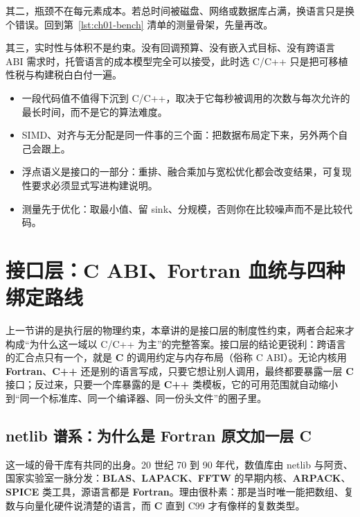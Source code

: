 \documentclass[12pt,a4paper,fontset=fandol]{ctexbook}
\newcommand{\Lib}[1]{\textbf{#1}}
\newcommand{\Lang}[1]{\textsf{\bfseries #1}}
\newcommand{\CL}{\Lang{C}}
\newcommand{\CPP}{\Lang{C++}}
\newcommand{\FTN}{\Lang{Fortran}}
\begin{document}
其二，瓶颈不在每元素成本。若总时间被磁盘、网络或数据库占满，换语言只是换个错误。回到第~\ref{lst:ch01-bench} 清单的测量骨架，先量再改。

其三，实时性与体积不是约束。没有回调预算、没有嵌入式目标、没有跨语言 ABI 需求时，托管语言的成本模型完全可以接受，此时选 C/C++ 只是把可移植性税与构建税白白付一遍。

\begin{guideline}[title={本章的判断口径}]
\begin{itemize}
\item 一段代码值不值得下沉到 C/C++，取决于它每秒被调用的次数与每次允许的最长时间，而不是它的算法难度。
\item SIMD、对齐与无分配是同一件事的三个面：把数据布局定下来，另外两个自己会跟上。
\item 浮点语义是接口的一部分：重排、融合乘加与宽松优化都会改变结果，可复现性要求必须显式写进构建说明。
\item 测量先于优化：取最小值、留 sink、分规模，否则你在比较噪声而不是比较代码。
\end{itemize}
\end{guideline}

\chapter{接口层：C ABI、Fortran 血统与四种绑定路线}

上一节讲的是执行层的物理约束，本章讲的是接口层的制度性约束，两者合起来才构成``为什么这一域以 C/C++ 为主''的完整答案。接口层的结论更锐利：跨语言的汇合点只有一个，就是 \CL{} 的调用约定与内存布局（俗称 C ABI）。无论内核用 \FTN{}、\CPP{} 还是别的语言写成，只要它想让别人调用，最终都要暴露一层 \CL{} 接口；反过来，只要一个库暴露的是 \CPP{} 类模板，它的可用范围就自动缩小到``同一个标准库、同一个编译器、同一份头文件''的圈子里。

\section{netlib 谱系：为什么是 Fortran 原文加一层 C}

这一域的骨干库有共同的出身。20 世纪 70 到 90 年代，数值库由 netlib 与阿贡、国家实验室一脉分发：\Lib{BLAS}、\Lib{LAPACK}、\Lib{FFTW} 的早期内核、\Lib{ARPACK}、\Lib{SPICE} 类工具，源语言都是 \FTN{}。理由很朴素：那是当时唯一能把数组、复数与向量化硬件说清楚的语言，而 \CL{} 直到 C99 才有像样的复数类型。
\end{document}
